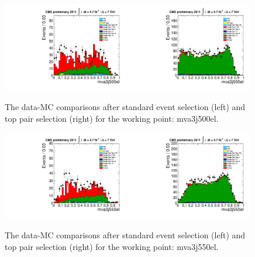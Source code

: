 \begin{figure}[!t]
  \centering
  \includegraphics[width=0.49\textwidth]{figs/cl-mva3j500el-normal.pdf}
  \includegraphics[width=0.49\textwidth]{figs/cl-mva3j500el-inTTbar.pdf}
  \caption{\label{fig:mva:plots-mva3j500el} The data-MC comparisons
    after standard event selection (left) and top pair
    selection (right) for the working point: mva3j500el.}
\end{figure}

\begin{figure}[!t]
  \centering
  \includegraphics[width=0.49\textwidth]{figs/cl-mva3j550el-normal.pdf}
  \includegraphics[width=0.49\textwidth]{figs/cl-mva3j550el-inTTbar.pdf}
  \caption{\label{fig:mva:plots-mva3j550el} The data-MC comparisons
    after standard event selection (left) and top pair
    selection (right) for the working point: mva3j550el.}
\end{figure}

